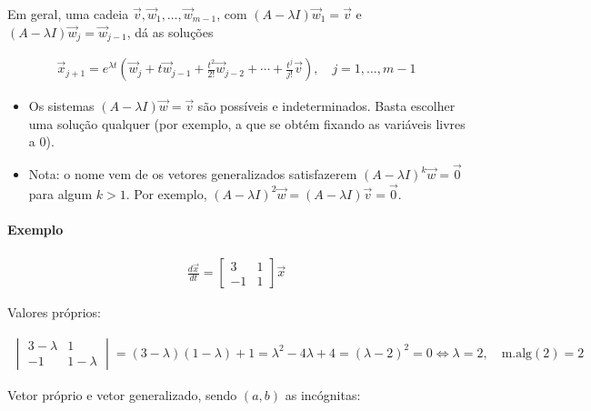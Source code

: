 \documentclass{article}
\begin{document}
Em geral, uma cadeia $\vec{v}, \vec{w}_1, \ldots, \vec{w}_{m-1}$, com $(A - \lambda I)\vec{w}_1 = \vec{v}$ e
$(A - \lambda I)\vec{w}_j = \vec{w}_{j-1}$, dá as soluções

\begin{gather*}
\vec{x}_{j+1} = e^{\lambda t} \left( \vec{w}_j + t\vec{w}_{j-1} + \frac{t^2}{2!}\vec{w}_{j-2} + \cdots
+ \frac{t^j}{j!}\vec{v} \right), \quad j = 1, \ldots, m - 1
\end{gather*}

\begin{itemize}
    \item Os sistemas $(A - \lambda I)\vec{w} = \vec{v}$ são possíveis e indeterminados. Basta escolher uma
    solução qualquer (por exemplo, a que se obtém fixando as variáveis livres a $0$).
    \item Nota: o nome vem de os vetores generalizados satisfazerem $(A - \lambda I)^k \vec{w} = \vec{0}$
    para algum $k > 1$. Por exemplo, $(A - \lambda I)^2 \vec{w} = (A - \lambda I)\vec{v} = \vec{0}$.
\end{itemize}

\paragraph{Exemplo}

\begin{gather*}
\frac{d\vec{x}}{dt} =
\begin{bmatrix}
3 & 1 \\
-1 & 1
\end{bmatrix}
\vec{x}
\end{gather*}

Valores próprios:

\begin{gather*}
\begin{vmatrix}
3 - \lambda & 1 \\
-1 & 1 - \lambda
\end{vmatrix}
= (3 - \lambda)(1 - \lambda) + 1 = \lambda^2 - 4\lambda + 4 = (\lambda - 2)^2 = 0
\Leftrightarrow \lambda = 2,
\quad \text{m.alg}(2) = 2
\end{gather*}

Vetor próprio e vetor generalizado, sendo $(a, b)$ as incógnitas:
\end{document}

